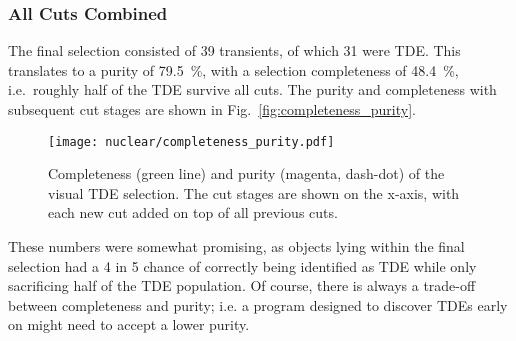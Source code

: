 \subsubsection{All Cuts Combined}
The final selection consisted of 39 transients, of which 31 were TDE. This translates to a purity of \SI{79.5}{\percent}, with a selection completeness of \SI{48.4}{\percent}, i.e.~roughly half of the TDE survive all cuts.
The purity and completeness with subsequent cut stages are shown in Fig.~\ref{fig:completeness_purity}.

\begin{figure}[htpb]
  \texttt{[image: nuclear/completeness\_purity.pdf]}
  \caption[Visual TDE selection]{Completeness (green line) and purity (magenta, dash-dot) of the visual TDE selection. The cut stages are shown on the x-axis, with each new cut added on top of all previous cuts.}
\end{figure}

These numbers were somewhat promising, as objects lying within the final selection had a 4 in 5 chance of correctly being identified as TDE while only sacrificing half of the TDE population. Of course, there is always a trade-off between completeness and purity; i.e. a program designed to discover TDEs early on might need to accept a lower purity.

